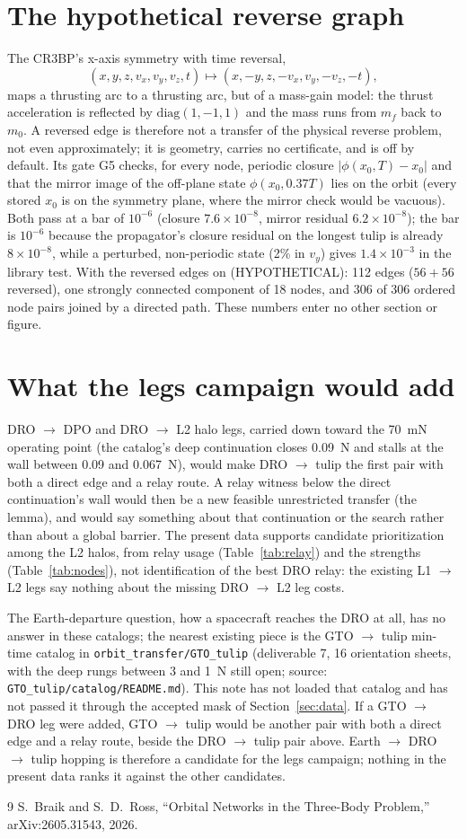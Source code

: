 \documentclass[11pt]{article}
\begin{document}
\section{The hypothetical reverse graph}
The CR3BP's x-axis symmetry with time reversal,
\[(x,y,z,v_x,v_y,v_z,t) \mapsto (x,-y,z,-v_x,v_y,-v_z,-t),\]
maps a thrusting arc to a thrusting arc,
but of a mass-gain model: the thrust acceleration is reflected by $\mathrm{diag}(1,-1,1)$ and the mass
runs from $m_f$ back to $m_0$. A reversed edge is therefore not a transfer of the physical reverse
problem, not even approximately; it is geometry, carries no certificate, and is off by default. Its
gate G5 checks, for every node, periodic closure $|\phi(x_0,T) - x_0|$ and that the mirror image of
the off-plane state $\phi(x_0, 0.37T)$ lies on the orbit (every stored $x_0$ is on the symmetry
plane, where the mirror check would be vacuous). Both pass at a bar of $10^{-6}$ (closure
$7.6\times10^{-8}$, mirror residual $6.2\times10^{-8}$); the bar is $10^{-6}$ because the
propagator's closure residual on the longest tulip is already $8\times10^{-8}$, while a
perturbed, non-periodic state (2\% in $v_y$) gives $1.4\times10^{-3}$ in the library test. With the reversed edges on (HYPOTHETICAL): 112 edges
($56 + 56$ reversed), one strongly connected component of 18 nodes, and 306 of 306 ordered node
pairs joined by a directed path. These numbers enter no other section or figure.

\section{What the legs campaign would add}
DRO $\to$ DPO and DRO $\to$ L2 halo legs, carried down toward the 70~mN operating point (the
catalog's deep continuation closes 0.09~N and stalls at the wall between 0.09 and 0.067~N), would make DRO $\to$ tulip the
first pair with both a direct edge and a relay route. A relay witness below the direct continuation's
wall would then be a new feasible unrestricted transfer (the lemma), and would say something
about that continuation or the search rather than about a global barrier. The present data supports
candidate prioritization among the L2 halos, from relay usage (Table~\ref{tab:relay}) and the
strengths (Table~\ref{tab:nodes}), not identification of the best DRO relay: the existing
L1 $\to$ L2 legs say nothing about the missing DRO $\to$ L2 leg costs.

The Earth-departure question, how a spacecraft reaches the DRO at all, has no answer in these catalogs;
the nearest existing piece is the GTO $\to$ tulip min-time catalog in \texttt{orbit\_transfer/GTO\_tulip}
(deliverable 7, 16 orientation sheets, with the deep rungs between 3 and 1~N still open; source:
\texttt{GTO\_tulip/catalog/README.md}). This note has not loaded that catalog and has not passed it
through the accepted mask of Section~\ref{sec:data}. If a GTO $\to$ DRO leg were added, GTO
$\to$ tulip would be another pair with both a direct edge and a relay route, beside the DRO
$\to$ tulip pair above. Earth $\to$ DRO $\to$ tulip hopping is therefore a candidate for the legs
campaign; nothing in the present data ranks it against the other candidates.

\begin{thebibliography}{9}
 S.~Braik and S.~D.~Ross, ``Orbital Networks in the Three-Body Problem,'' arXiv:2605.31543, 2026.
\end{thebibliography}
\end{document}

